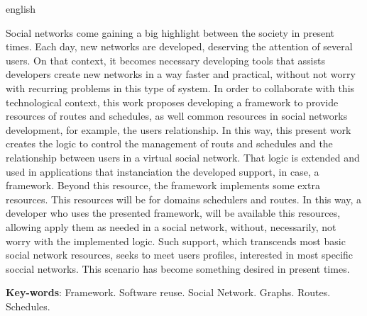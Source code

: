 \begin{resumo}[Abstract]
 \begin{otherlanguage*}{english}
   
   Social networks come gaining a big highlight between the society in present times. Each day, new networks are developed, deserving the attention of several users. On that context, it becomes necessary developing tools that assists developers create new networks in a way faster and practical, without not worry with recurring problems in this type of system. In order to collaborate with this technological context, this work proposes developing a framework to provide resources of routes and schedules, as well common resources in social networks development, for example, the users relationship. In this way, this present work creates the logic to control the management of routs and schedules and the relationship between users in a virtual social network. That logic is extended and used in applications that instanciation the developed support, in case, a framework. Beyond this resource, the framework implements some extra resources. This resources will be for domains schedulers and routes. In this way, a developer who uses the presented framework, will be available this resources, allowing apply them as needed in a social network, without, necessarily, not worry with the implemented logic. Such support, which transcends most basic social network resources, seeks to meet users profiles, interested in most specific soccial networks. This scenario has become something desired in present times.

   \vspace{\onelineskip}
 
   \noindent 
   \textbf{Key-words}: Framework. Software reuse. Social Network. Graphs. Routes. Schedules.
 \end{otherlanguage*}
\end{resumo}
